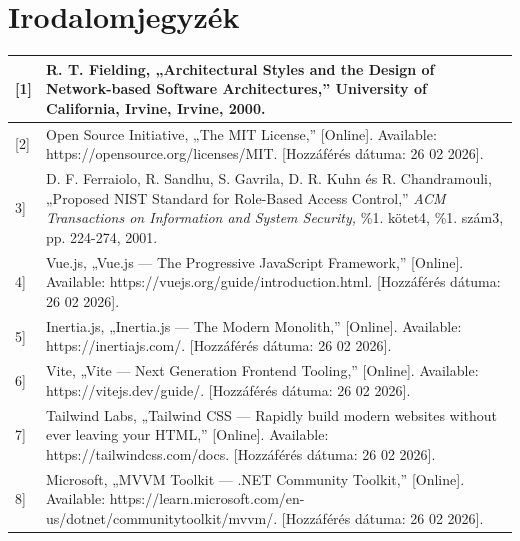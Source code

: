 \section{Irodalomjegyzék}\label{irodalomjegyzuxe9k}

{\def\LTcaptype{} %
\begin{longtable}[]{@{}
  >{\raggedright\arraybackslash}p{}
  >{\raggedright\arraybackslash}p{}@{}}
\toprule\noalign{}
\begin{minipage}[b]{\linewidth}\raggedright
{[}1{]}
\end{minipage} & \begin{minipage}[b]{\linewidth}\raggedright
R. T. Fielding, „Architectural Styles and the Design of Network-based Software Architectures,'' University of California, Irvine, Irvine, 2000.
\end{minipage} \\
\midrule\noalign{}
\endhead
\bottomrule\noalign{}
\endlastfoot
{[}2{]} & Open Source Initiative, „The MIT License,'' {[}Online{]}. Available: https://opensource.org/licenses/MIT. {[}Hozzáférés dátuma: 26 02 2026{]}. \\
{[}3{]} & D. F. Ferraiolo, R. Sandhu, S. Gavrila, D. R. Kuhn és R. Chandramouli, „Proposed NIST Standard for Role-Based Access Control,'' \emph{ACM Transactions on Information and System Security,} \%1. kötet4, \%1. szám3, pp. 224-274, 2001. \\
{[}4{]} & Vue.js, „Vue.js --- The Progressive JavaScript Framework,'' {[}Online{]}. Available: https://vuejs.org/guide/introduction.html. {[}Hozzáférés dátuma: 26 02 2026{]}. \\
{[}5{]} & Inertia.js, „Inertia.js --- The Modern Monolith,'' {[}Online{]}. Available: https://inertiajs.com/. {[}Hozzáférés dátuma: 26 02 2026{]}. \\
{[}6{]} & Vite, „Vite --- Next Generation Frontend Tooling,'' {[}Online{]}. Available: https://vitejs.dev/guide/. {[}Hozzáférés dátuma: 26 02 2026{]}. \\
{[}7{]} & Tailwind Labs, „Tailwind CSS --- Rapidly build modern websites without ever leaving your HTML,'' {[}Online{]}. Available: https://tailwindcss.com/docs. {[}Hozzáférés dátuma: 26 02 2026{]}. \\
{[}8{]} & Microsoft, „MVVM Toolkit --- .NET Community Toolkit,'' {[}Online{]}. Available: https://learn.microsoft.com/en-us/dotnet/communitytoolkit/mvvm/. {[}Hozzáférés dátuma: 26 02 2026{]}. \\

\end{longtable}}
